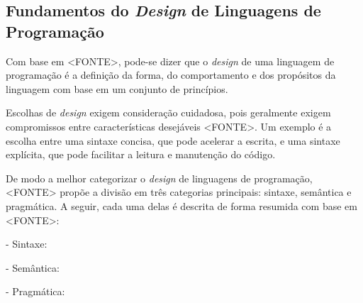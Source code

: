 
\subsection{Fundamentos do \textit{Design} de Linguagens de Programação}

Com base em <FONTE>, pode-se dizer que o \textit{design} de uma linguagem de programação é a definição da forma, do comportamento e dos propósitos da linguagem com base em um conjunto de princípios.

Escolhas de \textit{design} exigem consideração cuidadosa, pois geralmente exigem compromissos entre características desejáveis <FONTE>. Um exemplo é a escolha entre uma sintaxe concisa, que pode acelerar a escrita, e uma sintaxe explícita, que pode facilitar a leitura e manutenção do código.

De modo a melhor categorizar o \textit{design} de linguagens de programação, <FONTE> propõe a divisão em três categorias principais: sintaxe, semântica e pragmática. A seguir, cada uma delas é descrita de forma resumida com base em <FONTE>:

- Sintaxe:

- Semântica:

- Pragmática:
